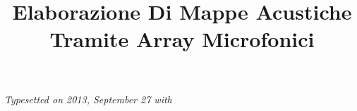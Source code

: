 \documentclass[a4paper,italian,12pt]{book}
\begin{document}
%
\setcounter{page}{1}
%
\title{Elaborazione Di Mappe Acustiche\\[2mm] Tramite Array Microfonici\\}
\providecommand{\autore}{LORENZO ROTTEGLIA}                        %
\providecommand{\principaladviser}{ANGELO FARINA}  %
\providecommand{\firstreader}{SIMONE CAMPANINI}            %
\providecommand{\annoacc}{2012--2013}
\providecommand{\corso}{\uppercase{Informatica}} %
\providecommand{\chiarmoprof}{Chiar.mo Prof.}
\providecommand{\dotting}{Dott. Ing.}
\providecommand{\dott}{Dott.}

\titlep

\pagestyle{fancy}
\renewcommand{\chaptermark}[1]{\markboth{#1}{}}
\renewcommand{\sectionmark}[1]{\markright{\thesection\ #1}}
\fancyhf{}
\fancyhead[LE,RO]{\bfseries\thepage}
\fancyhead[LO]{\bfseries\rightmark}
\fancyhead[RE]{\bfseries\leftmark}
\renewcommand{\headrulewidth}{0.5pt}
\renewcommand{\footrulewidth}{0pt}
\addtolength{\headheight}{0.5pt}
\addtolength{\headwidth}{1cm}
\fancypagestyle{plain}{\fancyhead{}\renewcommand{\headrulewidth}{0pt}}

\thispagestyle{empty}
\cleardoublepage

\newcommand{\ud}{\mathrm{d}}
\newcommand{\ue}{\mathrm{e}}
\newcommand{\um}{\textrm{m}}
\newcommand{\ums}{\textrm{ms}}
\newcommand{\ramsete}{\emph{Ramsete }}
\newcommand{\getir}{\emph{getIR }}
\newcommand{\eigen}{\emph{Eigenmike\textsuperscript{\texttrademark}}\;}
\newcommand{\audacity}{\emph{Audacity\textsuperscript{\textregistered}}\;}

       

\newpage
\thispagestyle{empty}
\cleardoublepage

\pagestyle{fancy}
%
\tableofcontents
\listoffigures 
\listoftables 
%
\normalsize
%
\newpage
\thispagestyle{empty}
\cleardoublepage
%
\setcounter{page}{13}
       
      
      
      
      
      
      
      


\appendix
\renewcommand{\chaptermark}[1]{\markboth{{\appendixname}\ \thechapter.\hspace{1em}#1}{}}
      


%



\thispagestyle{empty}
\cleardoublepage

    

\newpage

\vspace*{9cm}
\thispagestyle{empty}
\centering
\em
Typesetted on 2013, September 27 with \LaTeXe
\end{document}
